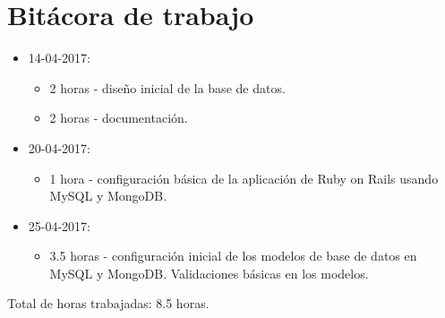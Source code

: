\documentclass{article}
\begin{document}
\section{Bit\'acora de trabajo}
\begin{itemize}
  \item 14-04-2017:
  \begin{itemize}
    \item 2 horas - dise\~no inicial de la base de datos.
    \item 2 horas - documentaci\'on.
  \end{itemize}
  \item 20-04-2017:
  \begin{itemize}
    \item 1 hora - configuraci\'on b\'asica de la aplicaci\'on de Ruby on Rails usando MySQL y MongoDB.
  \end{itemize}
  \item 25-04-2017:
  \begin{itemize}
    \item 3.5 horas - configuraci\'on inicial de los modelos de base de datos en MySQL y MongoDB. Validaciones b\'asicas en los modelos.
  \end{itemize}
\end{itemize}
Total de horas trabajadas: 8.5 horas.
\end{document}
